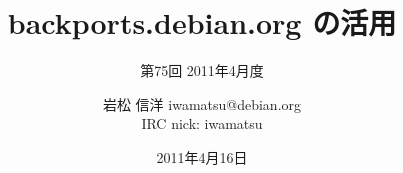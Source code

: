 




\documentclass[cjk,dvipdfmx,12pt]{beamer}
\usepackage{monthlypresentation}



\title{backports.debian.org の活用}
\subtitle{第75回 2011年4月度}
\author{岩松 信洋 iwamatsu@debian.org\\IRC nick: iwamatsu}
\date{2011年4月16日}



